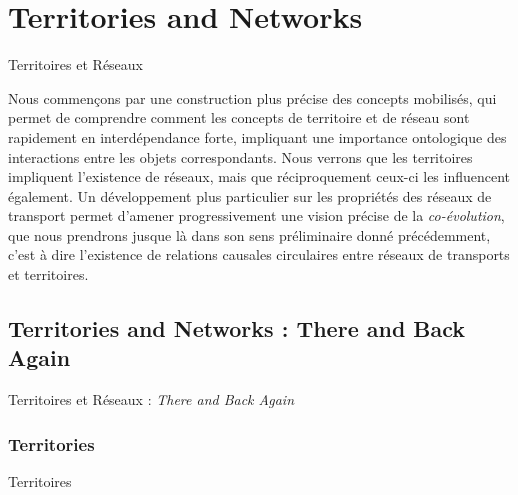 


\newpage




\section{Territories and Networks}{Territoires et Réseaux}

\label{sec:networkterritories}




Nous commençons par une construction plus précise des concepts mobilisés, qui permet de comprendre comment les concepts de territoire et de réseau sont rapidement en interdépendance forte, impliquant une importance ontologique des interactions entre les objets correspondants. Nous verrons que les territoires impliquent l'existence de réseaux, mais que réciproquement ceux-ci les influencent également. Un développement plus particulier sur les propriétés des réseaux de transport permet d'amener progressivement une vision précise de la \emph{co-évolution}, que nous prendrons jusque là dans son sens préliminaire donné précédemment, c'est à dire l'existence de relations causales circulaires entre réseaux de transports et territoires.


\subsection{Territories and Networks : There and Back Again}{Territoires et Réseaux : \emph{There and Back Again}}


\subsubsection{Territories}{Territoires}


